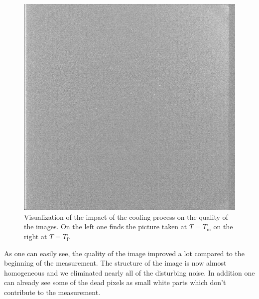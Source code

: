 \begin{figure}[H]
\begin{minipage}{0.35\textwidth}
		\includegraphics[scale=0.17]{figures/Exposures/cooling_end}
	\end{minipage}
	\caption[Impact of the cooling process]{Visualization of the impact of the cooling process on the quality of the images. On the left one finds the picture taken at $T = T_{\text{in}}$ on the right at $T = T_{\text{f}}$.}

\end{figure} 
As one can easily see, the quality of the image improved a lot compared to the beginning of the measurement. The structure of the image is now almost homogeneous and we eliminated nearly all of the disturbing noise. In addition one can already see some of the dead pixels as small white parts which don't contribute to the measurement. \\
 
